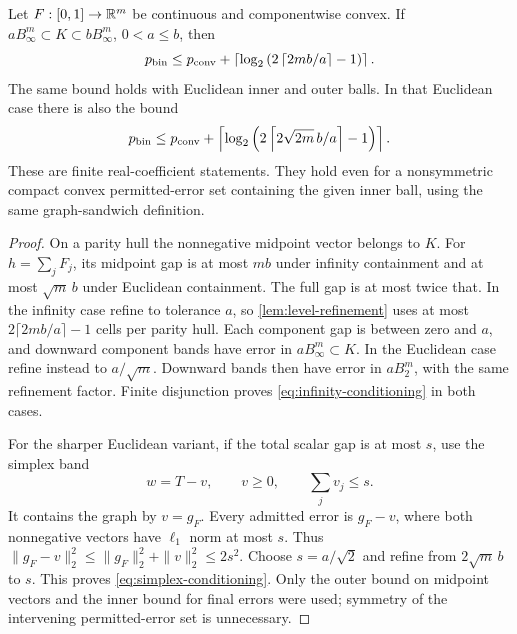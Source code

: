 \begin{proposition}\label{prop:conditioning}
Let $F:[0,1]\to\mathbb R^m$ be continuous and componentwise convex.
If $aB_\infty^m\subset K\subset bB_\infty^m$, $0<a\le b$, then
\begin{equation}\label{eq:infinity-conditioning}
 p_{\mathrm{bin}}\le p_{\mathrm{conv}}+
 \left\lceil\log_2\left(2\left\lceil2mb/a\right\rceil-1\right)\right\rceil.
\end{equation}
The same bound holds with Euclidean inner and outer balls. In that
Euclidean case there is also the bound
\begin{equation}\label{eq:simplex-conditioning}
 p_{\mathrm{bin}}\le p_{\mathrm{conv}}+
 \left\lceil\log_2\left(2\left\lceil2\sqrt{2m}\,b/a\right\rceil-1\right)\right\rceil.
\end{equation}
These are finite real-coefficient statements. They hold even for a
nonsymmetric compact convex permitted-error set containing the given
inner ball, using the same graph-sandwich definition.
\end{proposition}
\begin{proof}
On a parity hull the nonnegative midpoint vector belongs to $K$.
For $h=\sum_jF_j$, its midpoint gap is at most $mb$ under infinity
containment and at most $\sqrt m\,b$ under Euclidean containment.
The full gap is at most twice that. In the infinity case refine to
tolerance $a$, so \cref{lem:level-refinement} uses at most
$2\lceil2mb/a\rceil-1$ cells per parity hull. Each component gap
is between zero and $a$, and downward component bands have error in
$aB_\infty^m\subset K$. In the Euclidean case refine instead to
$a/\sqrt m$. Downward bands then have error in $aB_2^m$, with the
same refinement factor. Finite disjunction proves
\eqref{eq:infinity-conditioning} in both cases.

For the sharper Euclidean variant, if the total scalar gap is at most
$s$, use the simplex band
\begin{equation}\label{eq:simplex-band}
 w=T-v,\qquad v\ge0,\qquad \sum_jv_j\le s.
\end{equation}
It contains the graph by $v=g_F$. Every admitted error is $g_F-v$,
where both nonnegative vectors have $\ell_1$ norm at most $s$.
Thus $\|g_F-v\|_2^2\le\|g_F\|_2^2+\|v\|_2^2\le2s^2$.
Choose $s=a/\sqrt2$ and refine from $2\sqrt m\,b$ to $s$.
This proves \eqref{eq:simplex-conditioning}. Only the outer bound
on midpoint vectors and the inner bound for final errors were used;
symmetry of the intervening permitted-error set is unnecessary.
\end{proof}

